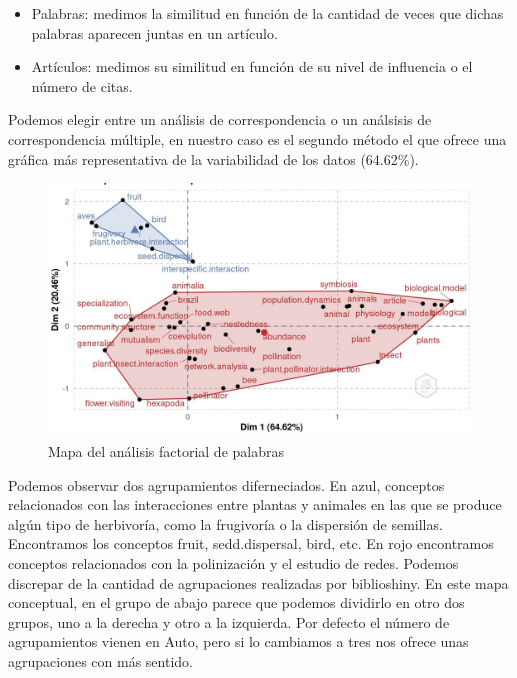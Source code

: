 \documentclass[
]{article}
\providecommand{\tightlist}{%
  \setlength{\itemsep}{0pt}\setlength{\parskip}{0pt}}
\begin{document}
\begin{itemize}
\tightlist
\item
  Palabras: medimos la similitud en función de la cantidad de veces que
  dichas palabras aparecen juntas en un artículo.
\item
  Artículos: medimos su similitud en función de su nivel de influencia o
  el número de citas.
\end{itemize}

Podemos elegir entre un análisis de correspondencia o un análsisis de
correspondencia múltiple, en nuestro caso es el segundo método el que
ofrece una gráfica más representativa de la variabilidad de los datos
(64.62\%).

\begin{figure}
\centering
\includegraphics{MapaAnalisisFactorial.JPG}
\caption{Mapa del análisis factorial de palabras}
\end{figure}

Podemos observar dos agrupamientos diferneciados. En azul, conceptos
relacionados con las interacciones entre plantas y animales en las que
se produce algún tipo de herbivoría, como la frugivoría o la dispersión
de semillas. Encontramos los conceptos fruit, sedd.dispersal, bird, etc.
En rojo encontramos conceptos relacionados con la polinización y el
estudio de redes. Podemos discrepar de la cantidad de agrupaciones
realizadas por biblioshiny. En este mapa conceptual, en el grupo de
abajo parece que podemos dividirlo en otro dos grupos, uno a la derecha
y otro a la izquierda. Por defecto el número de agrupamientos vienen en
Auto, pero si lo cambiamos a tres nos ofrece unas agrupaciones con más
sentido.
\end{document}
